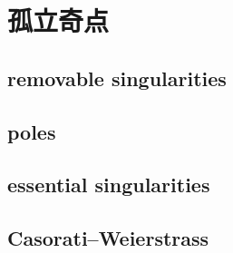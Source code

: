 \section{孤立奇点}
\label{b3:sec:0302}


\subsection{removable singularities}
\label{b3:subsec:030201}

\subsection{poles}
\label{b3:subsec:030202}

\subsection{essential singularities}
\label{b3:subsec:030203}

\subsection{Casorati–Weierstrass}
\label{b3:subsec:030204}


